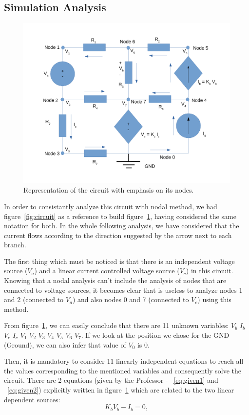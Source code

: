 \subsection{Simulation Analysis}
\label{sec:Simulation Analysis}

\begin{figure}[!ht] \centering
\includegraphics[width=0.8\linewidth]{circuit_node.pdf}
\caption{Representation of the circuit with emphasis on its nodes.}
\label{fig:nodescircuit}
\end{figure}

In order to consistantly analyze this circuit with nodal method, we had figure~\ref{fig:circuit} as a reference to build figure~\ref{fig:nodescircuit}, having considered the same notation for both. In the whole following analysis, we have considered that the current flows according to the direction suggested by the arrow next to each branch. 

The first thing which must be noticed is that there is an independent voltage source ($V_a$) and a linear current controlled voltage source ($V_c$) in this circuit. Knowing that a nodal analysis can't include the analysis of nodes that are connected to voltage sources, it becomes clear that is useless to analyze nodes 1 and 2 (connected to $V_a$) and also nodes 0 and 7 (connected to $V_c$) using this method.

From figure~\ref{fig:nodescircuit}, we can easily conclude that there are 11 unknown variables: $V_b$ $I_b$ $V_c$ $I_c$ $V_1$ $V_2$ $V_3$ $V_4$ $V_5$ $V_6$ $V_7$. If we look at the position we chose for the GND (Ground), we can also infer that value of $V_0$ is 0.

Then, it is mandatory to consider 11 linearly independent equations to reach all the values corresponding to the mentioned variables and consequently solve the circuit. There are 2 equations (given by the Professor - ~\ref{eq:given1} and ~\ref{eq:given2}) explicitly written in figure~\ref{fig:nodescircuit} which are related to the two linear dependent sources:
\begin{equation}
  K_{b}V_{b} - I_{b} = 0,
  \label{eq:given1}
\end{equation}

